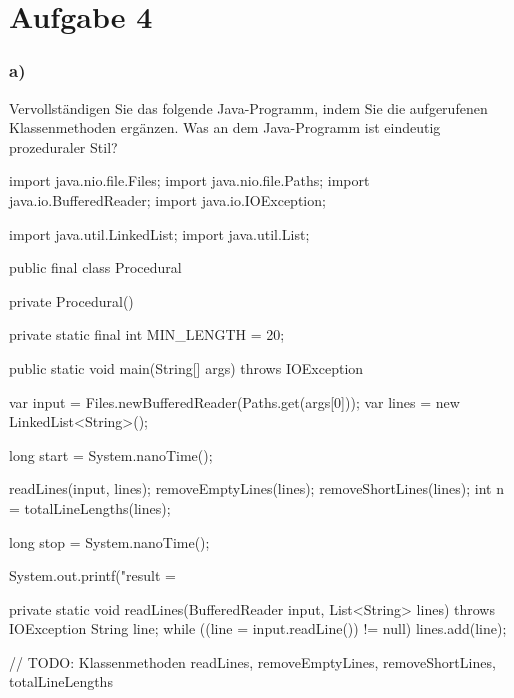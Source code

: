 \chapter{Aufgabe 4}
\label{sec:aufgabe4}

\subsection*{a)}
Vervollständigen Sie das folgende Java-Programm, indem Sie die aufgerufenen Klassenmethoden ergänzen.
Was an dem Java-Programm ist eindeutig prozeduraler Stil?
\newline
\begin{code}[language=java, caption={Aufgabe 4a}, label={lst:Aufgabe4a}]
import java.nio.file.Files;
import java.nio.file.Paths;
import java.io.BufferedReader;
import java.io.IOException;

import java.util.LinkedList;
import java.util.List;

public final class Procedural {
    private Procedural() { }

    private static final int MIN_LENGTH = 20;

    public static void main(String[] args) throws IOException {
        var input = Files.newBufferedReader(Paths.get(args[0]));
        var lines = new LinkedList<String>();

        long start = System.nanoTime();

        readLines(input, lines);
        removeEmptyLines(lines);
        removeShortLines(lines);
        int n = totalLineLengths(lines);

        long stop = System.nanoTime();

        System.out.printf("result = %
    }

    private static void readLines(BufferedReader input, List<String> lines) throws IOException {
        String line;
        while ((line = input.readLine()) != null) {
            lines.add(line);
        }
    }

    // TODO: Klassenmethoden readLines, removeEmptyLines, removeShortLines, totalLineLengths
}
\end{code}
\newline

